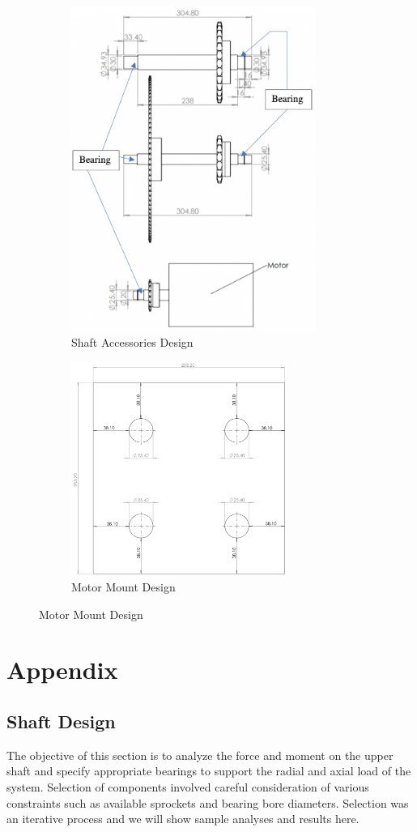 \documentclass[letterpaper,12pt]{article}
\begin{document}
\begin{figure}[!h]
\centering
  \begin{subfigure}[b]{0.45\textwidth}
    \includegraphics[width=8cm]{A3/shaft_drawing2.png}
    \caption{Shaft Accessories Design}
    \label{fig:1}
  \end{subfigure}
  \begin{subfigure}[b]{0.45\textwidth}
    \includegraphics[width=7cm]{A3/mount_drawing.png}
    \caption{Motor Mount Design}
    \label{fig:2}
  \end{subfigure}
\end{figure}

\newpage

\section{Appendix}
\subsection{Shaft Design}
The objective of this section is to analyze the force and moment on the upper shaft and specify appropriate bearings to support the radial and axial load of the system. Selection of components involved careful consideration of various constraints such as available sprockets and bearing bore diameters. Selection was an iterative process and we will show sample analyses and results here.
\end{document}
